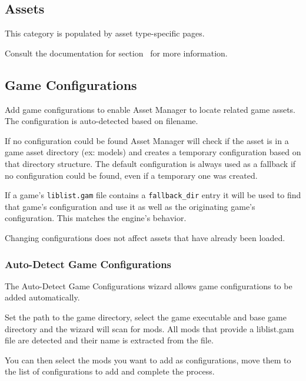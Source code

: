 \documentclass[10pt, a4paper, titlepage, oneside]{article}
\newcommand{\code}[1]{\mbox{\texttt{#1}}}
\begin{document}
\newpage

\subsection{Assets}

This category is populated by asset type-specific pages.

Consult the documentation for section~ for more information.

\subsection{Game Configurations}
\label{sec:game_configurations}

Add game configurations to enable Asset Manager to locate related game assets.
The configuration is auto-detected based on filename.

\vspace{\baselineskip}
If no configuration could be found Asset Manager will check if the asset is in a game asset directory (ex: models) and creates a temporary configuration based on that directory structure.
The default configuration is always used as a fallback if no configuration could be found, even if a temporary one was created.

\vspace{\baselineskip}
If a game's \code{liblist.gam} file contains a \code{fallback\_dir} entry it will be used to find that game's configuration and use it as well as the originating game's configuration. This matches the engine's behavior.

\vspace{\baselineskip}
Changing configurations does not affect assets that have already been loaded.

\subsubsection{Auto-Detect Game Configurations}

The Auto-Detect Game Configurations wizard allows game configurations to be added automatically.

\vspace{\baselineskip}
Set the path to the game directory, select the game executable and base game directory and the wizard will scan for mods. All mods that provide a liblist.gam file are detected and their name is extracted from the file.

\vspace{\baselineskip}
You can then select the mods you want to add as configurations, move them to the list of configurations to add and complete the process.
\end{document}
